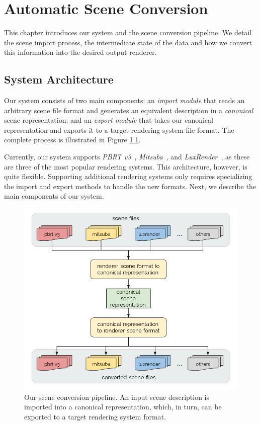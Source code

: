 \chapter{Automatic Scene Conversion} 
\label{sec:systemarch}
This chapter introduces our system and the scene conversion pipeline. We detail the scene import process, the intermediate state of the data and how we convert this information into the desired output renderer.

\section{System Architecture}
Our system 
consists of two main components: an {\it import module} that reads an arbitrary scene file format and generates an equivalent description in a {\it canonical} scene representation; and an {\it export module} that takes our canonical representation and exports it to a target rendering system file format. The complete process is illustrated in Figure \ref{fig:sysarch}. 

Currently, our system supports \textit{PBRT v3}~\cite{PBRT:v3}, \textit{Mitsuba}~\cite{mitsuba}, and \textit{LuxRender}~\cite{luxrender}, as these are three of the most popular rendering systems. This architecture, however, is quite flexible. Supporting additional rendering systems only requires specializing the import and export methods to handle the new formats. Next, we describe the main components of our system.

\begin{figure}[h]
  \includegraphics[width=\textwidth,height=\textheight,keepaspectratio]{images/4_system_architecture/architecture.png}
  \caption{Our scene conversion pipeline. An input scene description is imported into a canonical representation, which, in turn, can be exported to a target rendering system format.}
  \label{fig:sysarch}
\end{figure}

